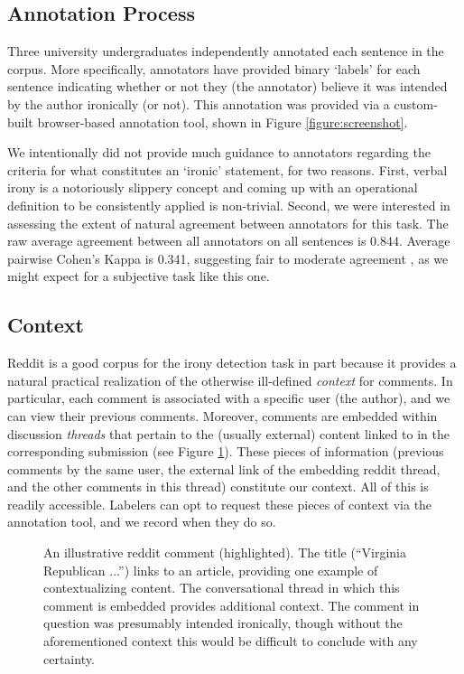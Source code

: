 \documentclass[11pt]{article}
\begin{document}
\subsection{Annotation Process}
\label{section:annotation}

Three university undergraduates independently annotated each sentence in the corpus. More specifically, annotators have provided binary `labels' for each sentence indicating whether or not they (the annotator) believe it was intended by the author ironically (or not). This annotation was provided via a custom-built browser-based annotation tool, shown in Figure \ref{figure:screenshot}.

We intentionally did not provide much guidance to annotators regarding the criteria for what constitutes an `ironic' statement, for two reasons. First, verbal irony is a notoriously slippery concept \cite{gibbs_07} and coming up with an operational definition to be consistently applied is non-trivial. Second, we were interested in assessing the extent of natural agreement between annotators for this task. The raw average agreement between all annotators on all sentences is 0.844. Average pairwise Cohen's Kappa \cite{cohen} is 0.341, suggesting fair to moderate agreement \cite{viera-05}, as we might expect for a subjective task like this one.

\subsection{Context}
\label{section:context}

Reddit is a good corpus for the irony detection task in part because it provides a natural practical realization of the otherwise ill-defined \emph{context} for comments. In particular, each comment is associated with a specific user (the author), and we can view their previous comments. Moreover, comments are embedded within discussion \emph{threads} that pertain to the (usually external) content linked to in the corresponding submission (see Figure \ref{figure:context}). These pieces of information (previous comments by the same user, the external link of the embedding reddit thread, and the other comments in this thread) constitute our context. All of this is readily accessible. Labelers can opt to request these pieces of context via the annotation tool, and we record when they do so. 

\begin{figure}
	\caption{An illustrative reddit comment (highlighted). The title (``Virginia Republican ...'') links to an article, providing one example of contextualizing content. The conversational thread in which this comment is embedded provides additional context. The comment in question was presumably intended ironically, though without the aforementioned context this would be difficult to conclude with any certainty.}
		\label{figure:context}
		\vspace{-1.5em}
\end{figure}
\end{document}
